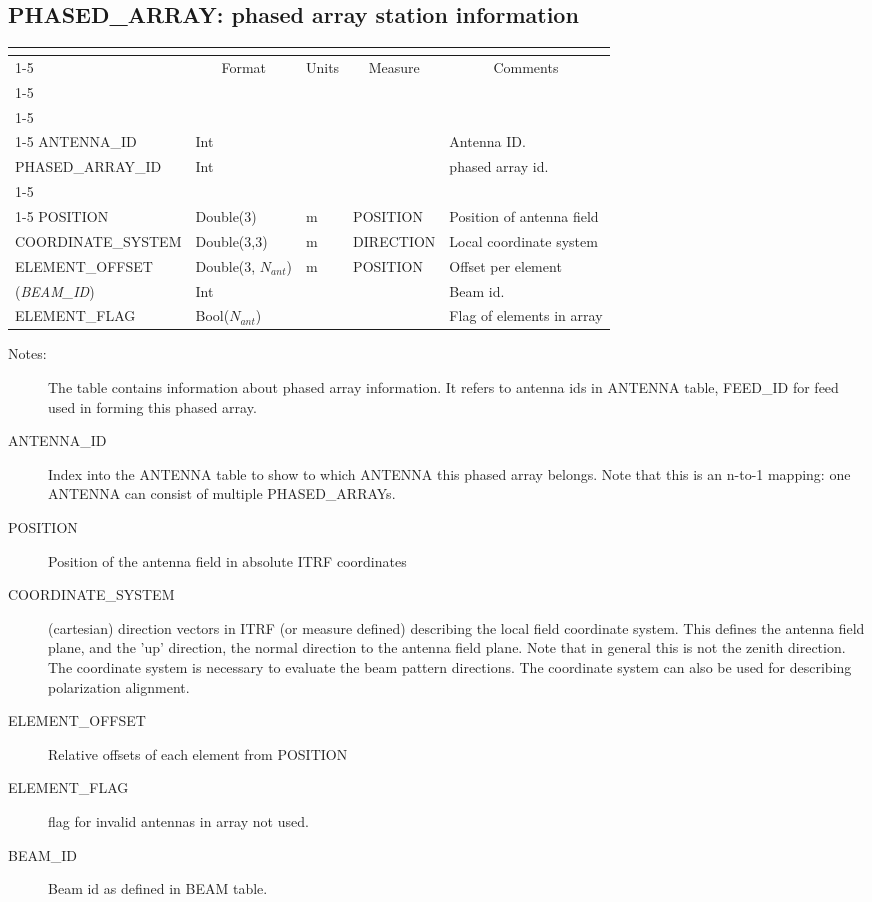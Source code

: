 \documentclass{article}
\newcommand{\na}{$N_{ant}$}
\newcommand{\defline}[1]{\cline{1-5}
\multicolumn{5}{|l|}{#1} \\
\cline{1-5}}
\newcommand{\definetable}[3][]
{
  \vfill\newpage
  \subsection{#2}
  \label{tbl:#1}
  \vspace{0.15in}
  \small
  \begin{tabular}{|l|p{1.25in}|l|p{.9in}|p{1.4in}|}
  \hline
  \multicolumn{5}{|c|}{\bf #1}\\
  \cline{1-5}
  \multicolumn{1}{|c|}{Name}&\multicolumn{1}{|c|}{Format}&
  \multicolumn{1}{|c|}{Units}&\multicolumn{1}{|c|}{Measure}&
  \multicolumn{1}{|c|}{Comments}\\
  \cline{1-5}
  #3
  \hline
  \end{tabular}
}
\begin{document}
\definetable{PHASED\_ARRAY: phased array station information}{
\defline{\bf Columns}
\defline{\em Key}
ANTENNA\_ID & Int & & & Antenna ID. \\
PHASED\_ARRAY\_ID & Int & & & phased array id.\\
\defline{\em Data}
POSITION & Double(3) & m & POSITION & Position of antenna field \\
COORDINATE\_SYSTEM & Double(3,3) & m & DIRECTION & Local coordinate system \\
ELEMENT\_OFFSET & Double(3, \na) & m & POSITION & Offset per element \\
({\it BEAM\_ID}) & Int &  &  & Beam id.\\
ELEMENT\_FLAG & Bool(\na) &  & & Flag of elements in array\\
}
\begin{description}

\item[Notes:] The table contains information about phased array information. It refers to antenna ids in ANTENNA table, FEED\_ID for feed  used in forming this phased array.

\item[ANTENNA\_ID] Index into the ANTENNA table to show to which ANTENNA this phased array belongs. Note that this is an n-to-1 mapping: one ANTENNA can consist of multiple PHASED\_ARRAYs.

\item[POSITION] Position of the antenna field in absolute ITRF coordinates

\item[COORDINATE\_SYSTEM] (cartesian) direction vectors in ITRF (or measure defined) describing the
local field coordinate system. This defines the antenna field plane, and the 'up' direction, the normal direction to the antenna field plane. Note that in general this is not the zenith direction. The coordinate system is necessary to evaluate the beam pattern directions. The coordinate system can also be used for describing polarization alignment.

\item[ELEMENT\_OFFSET] Relative offsets of each element from POSITION

\item[ELEMENT\_FLAG] flag for invalid antennas in array not used.

\item[BEAM\_ID] Beam id as defined in BEAM table.


\end{description}
\end{document}
